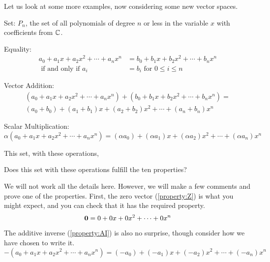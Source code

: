\documentclass{ximera}
\begin{document}
Let us look at some more examples, now considering some new vector spaces.

\begin{example}

  Set: $P_n$, the set of all polynomials of degree $n$ or less in the variable $x$ with coefficients from $\mathbb{C}$.

  Equality:
  \begin{align*}
    a_0+a_1x+a_2x^2+\cdots+a_nx^n&=b_0+b_1x+b_2x^2+\cdots+b_nx^n\\
    \text{ if and only if }a_i&=b_i\text{ for }0\leq i\leq n
  \end{align*}


  Vector Addition:
  \begin{align*}
    (a_0+a_1x+a_2x^2+\cdots+a_nx^n)+(b_0+b_1x+b_2x^2+\cdots+b_nx^n)=\\
    (a_0+b_0)+(a_1+b_1)x+(a_2+b_2)x^2+\cdots+(a_n+b_n)x^n
  \end{align*}

  Scalar Multiplication:
  \[
    \alpha(a_0+a_1x+a_2x^2+\cdots+a_nx^n)=(\alpha a_0)+(\alpha a_1)x+(\alpha a_2)x^2+\cdots+(\alpha a_n)x^n
  \]

This set, with these operations, 

  Does this set with these operations fulfill the ten properties?  
  \begin{multipleChoice}
  \end{multipleChoice}
  
  \begin{feedback}[correct]
    We will not work all the details here.  However, we will make a
    few comments and prove one of the properties.  First, the zero
    vector (\ref{property:Z}) is what you might expect, and you can
    check that it has the required property.
    \[
      \mathbf{0}=0+0x+0x^2+\cdots+0x^n
    \]
    
    The additive inverse (\ref{property:AI}) is also no surprise, though consider how we have chosen to write it.
    \[
      -\left(a_0+a_1x+a_2x^2+\cdots+a_nx^n\right)=(-a_0)+(-a_1)x+(-a_2)x^2+\cdots+(-a_n)x^n
    \]


\end{feedback}
\end{example}
\end{document}
